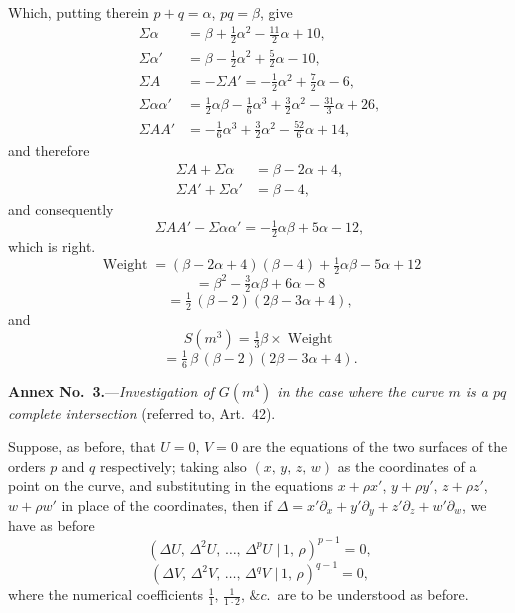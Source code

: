 \documentclass[11pt,a4paper]{article}
\providecommand{\mid}{\,|\,}
\providecommand{\Weight}{\operatorname{Weight}}
\begin{document}
Which, putting therein $p+q = \alpha$, $pq = \beta$, give
\begin{align*}
\Sigma\alpha   &= \beta + \tfrac{1}{2}\alpha^2 - \tfrac{11}{2}\alpha + 10,\\
\Sigma\alpha'  &= \beta - \tfrac{1}{2}\alpha^2 + \tfrac{5}{2}\alpha - 10,\\
\Sigma A &= -\Sigma A' = -\tfrac{1}{2}\alpha^2 + \tfrac{7}{2}\alpha - 6,\\
\Sigma\alpha\alpha' &= \tfrac{1}{2}\alpha\beta - \tfrac{1}{6}\alpha^3 + \tfrac{3}{2}\alpha^2 - \tfrac{31}{3}\alpha + 26,\\
\Sigma A A' &= -\tfrac{1}{6}\alpha^3 + \tfrac{3}{2}\alpha^2 - \tfrac{52}{6}\alpha + 14,
\end{align*}
and therefore
\begin{align*}
\Sigma A + \Sigma\alpha &= \beta - 2\alpha + 4,\\
\Sigma A' + \Sigma\alpha' &= \beta - 4,
\end{align*}
and consequently
\[
\Sigma A A' - \Sigma\alpha\alpha' = -\tfrac{1}{2}\alpha\beta + 5\alpha - 12,
\]
which is right.
\[
\Weight = (\beta - 2\alpha + 4)(\beta - 4) + \tfrac{1}{2}\alpha\beta - 5\alpha + 12
\]
\[
= \beta^2 - \tfrac{3}{2}\alpha\beta + 6\alpha - 8
\]
\[
= \tfrac{1}{2}\,(\beta - 2)(2\beta - 3\alpha + 4),
\]
and
\[
S(m^3) = \tfrac{1}{3}\beta \times \Weight
\]
\[
= \tfrac{1}{6}\,\beta\,(\beta - 2)(2\beta - 3\alpha + 4).
\]

\bigskip

\begin{center}
\textbf{Annex No.~3.}---\textit{Investigation of $G(m^4)$ in the case where the curve $m$ is a $pq$ complete intersection} (referred to, Art.~42).
\end{center}

Suppose, as before, that $U = 0$, $V = 0$ are the equations of the two surfaces of the orders $p$ and $q$ respectively; taking also $(x,\,y,\,z,\,w)$ as the coordinates of a point on the curve, and substituting in the equations $x + \rho x'$, $y + \rho y'$, $z + \rho z'$, $w + \rho w'$ in place of the coordinates, then if $\Delta = x' \partial_x + y' \partial_y + z' \partial_z + w' \partial_w$, we have as before
\[
(\Delta U,\,\Delta^2 U,\,\ldots,\,\Delta^p U\,\mid 1,\,\rho)^{p-1} = 0,
\]
\[
(\Delta V,\,\Delta^2 V,\,\ldots,\,\Delta^q V\,\mid 1,\,\rho)^{q-1} = 0,
\]
where the numerical coefficients $\tfrac{1}{1},\,\tfrac{1}{1\cdot 2},\,\&c.$\ are to be understood as before.

\medskip
\end{document}

